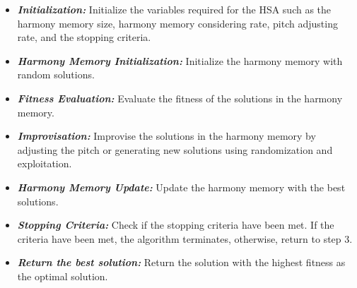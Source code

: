 \documentclass[conference]{IEEEtran}
\begin{document}
\begin{itemize}
	\item \textbf{\textit{Initialization:}} Initialize the variables required for the HSA such as the harmony memory size, harmony memory considering rate, pitch adjusting rate, and the stopping criteria.
	
	\item \textbf{\textit{Harmony Memory Initialization:}} Initialize the harmony memory with random solutions.
	
	\item \textbf{\textit{Fitness Evaluation:}} Evaluate the fitness of the solutions in the harmony memory.
	
	\item \textbf{\textit{Improvisation:}} Improvise the solutions in the harmony memory by adjusting the pitch or generating new solutions using randomization and exploitation.
	
	\item \textbf{\textit{Harmony Memory Update:}} Update the harmony memory with the best solutions.
	
	\item \textbf{\textit{Stopping Criteria:}} Check if the stopping criteria have been met. If the criteria have been met, the algorithm terminates, otherwise, return to step 3.
	
	\item \textbf{\textit{Return the best solution:}} Return the solution with the highest fitness as the optimal solution.
	
\end{itemize}
\end{document}
